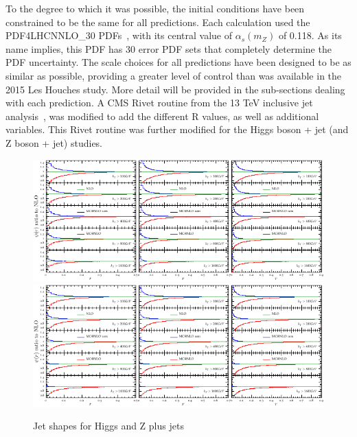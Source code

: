 \documentclass[aps,prd,onecolumn,fleqn,superscriptaddress,groupedaddress,nofootinbib,preprintnumbers,nobalancelastpage]{revtex4}
\begin{document}
To the degree to which it was possible, the initial conditions have been
constrained to be the same for all predictions. Each calculation used the
PDF4LHCNNLO\_30 PDFs~\cite{Butterworth:2015oua}, with its central value of
$\alpha_s(m_Z)$ of 0.118. As its name implies, this PDF has 30 error PDF sets
that completely determine the PDF uncertainty. The scale choices for all
predictions have been designed to be as similar as possible, 
providing a greater level of control than was available in the 2015 Les Houches
study. More detail will be
provided in the sub-sections dealing with each prediction. 
A CMS Rivet routine from the 13 TeV  inclusive jet analysis~\cite{Khachatryan:2016wdh}, was
modified to add the different R values, as well as additional variables. This
Rivet routine was further modified for the Higgs boson + jet (and Z boson + jet)
studies. 

\begin{figure}
\includegraphics[width=\textwidth]{plots/shapes/hj/hjshapes-crop.pdf}\\
\includegraphics[width=\textwidth]{plots/shapes/zj/zjshapes-crop.pdf}
\caption{Jet shapes for Higgs and Z plus jets}
\end{figure}


\end{document}
